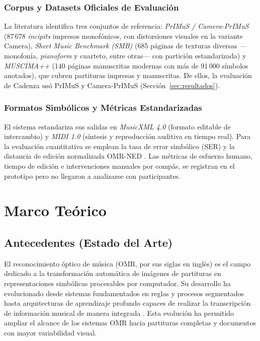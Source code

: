 \documentclass[conference]{IEEEtran}
\begin{document}
\subsubsection{Corpus y Datasets Oficiales de Evaluación}
La literatura identifica tres conjuntos de referencia: \emph{PrIMuS / Camera-PrIMuS} \cite{calvo2018,cameraprimus2018} (87\,678 \emph{incipits} impresos monofónicos, con distorsiones visuales en la variante Camera), \emph{Sheet Music Benchmark (SMB)} \cite{smb2025} (685 páginas de texturas diversas ---monofonía, \emph{pianoform} y cuarteto, entre otras--- con partición estandarizada) y \emph{MUSCIMA++} \cite{muscima2017} (140 páginas manuscritas modernas con más de 91\,000 símbolos anotados), que cubren partituras impresas y manuscritas. De ellos, la evaluación de Cadenza usó PrIMuS y Camera-PrIMuS (Sección~\ref{sec:resultados}).

\subsubsection{Formatos Simbólicos y Métricas Estandarizadas}
El sistema estandariza sus salidas en \emph{MusicXML 4.0} \cite{musicxml2021} (formato editable de intercambio) y \emph{MIDI 1.0} \cite{midi1996} (síntesis y reproducción auditiva en tiempo real). Para la evaluación cuantitativa se emplean la tasa de error simbólico (SER) y la distancia de edición normalizada OMR-NED \cite{smb2025}. Las métricas de esfuerzo humano, tiempo de edición e intervenciones manuales por compás, se registran en el prototipo pero no llegaron a analizarse con participantes.



\section{Marco Teórico}

\subsection{Antecedentes (Estado del Arte)}

El reconocimiento óptico de música (OMR, por sus siglas en inglés) es el
campo dedicado a la transformación automática de imágenes de partituras en
representaciones simbólicas procesables por computador. Su desarrollo ha
evolucionado desde sistemas fundamentados en reglas y procesos segmentados
hasta arquitecturas de aprendizaje profundo capaces de realizar la
transcripción de información musical de manera integrada
\cite{omr2020,rebelo2012}. Esta evolución ha permitido ampliar el
alcance de los sistemas OMR hacia partituras completas y documentos con
mayor variabilidad visual.
\end{document}
